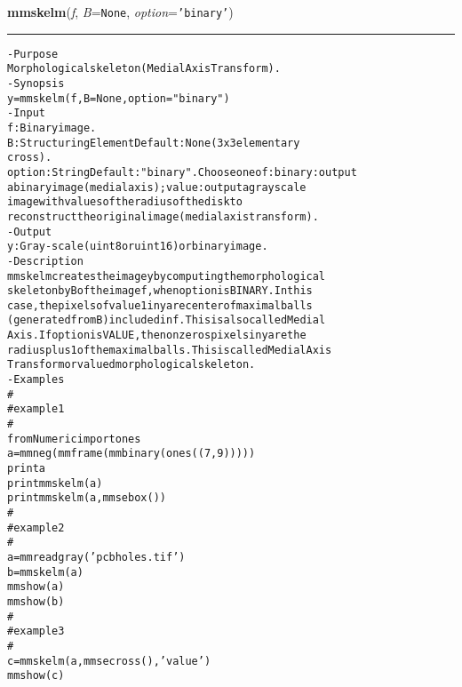     \begin{boxedminipage}{\textwidth}

    \raggedright \textbf{mmskelm}(\textit{f}, \textit{B}=\texttt{N\-o\-n\-e\-}, \textit{option}=\texttt{'\-b\-i\-n\-a\-r\-y\-'\-})

    \vspace{-1.5ex}

    \rule{\textwidth}{0.5\fboxrule}
\begin{alltt}
- Purpose
    Morphological skeleton (Medial Axis Transform).
- Synopsis
    y = mmskelm(f, B=None, option="binary")
- Input
    f:      Binary image.
    B:      Structuring Element Default: None (3x3 elementary
            cross).
    option: String Default: "binary". Choose one of: binary: output
            a binary image (medial axis); value: output a grayscale
            image with values of the radius of the disk to
            reconstruct the original image (medial axis transform).
- Output
    y: Gray-scale (uint8 or uint16) or binary image.
- Description
    mmskelm creates the image y by computing the morphological
    skeleton by B of the image f , when option is BINARY. In this
    case, the pixels of value 1 in y are center of maximal balls
    (generated from B ) included in f . This is also called Medial
    Axis. If option is VALUE, the non zeros pixels in y are the
    radius plus 1 of the maximal balls. This is called Medial Axis
    Transform or valued morphological skeleton.
- Examples
    \#
    \#   example 1
    \#
    from Numeric import ones
    a=mmneg(mmframe(mmbinary(ones((7,9)))))
    print a
    print mmskelm(a)
    print mmskelm(a,mmsebox())
    \#
    \#   example 2
    \#
    a=mmreadgray('pcbholes.tif')
    b=mmskelm(a)
    mmshow(a)
    mmshow(b)
    \#
    \#   example 3
    \#
    c=mmskelm(a,mmsecross(),'value')
    mmshow(c)\end{alltt}

    \vspace{1ex}

    \end{boxedminipage}

    \label{multireg:num_pymorph:mmskelmrec}
    \vspace{0.5ex}


